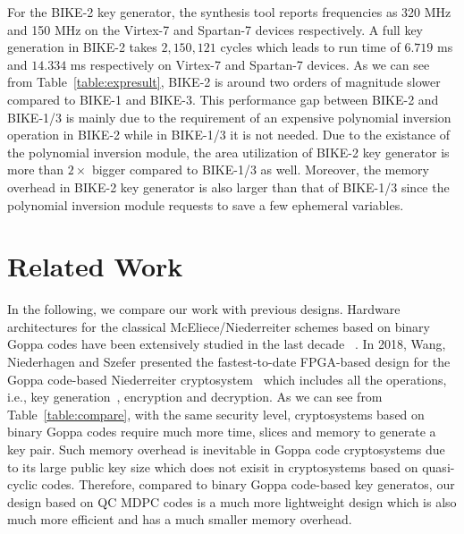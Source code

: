 \documentclass[runningheads]{llncs}
\begin{document}
For the BIKE-2 key generator, the synthesis tool reports
frequencies as 320 MHz and 150 MHz on the Virtex-7 and Spartan-7 devices respectively.
A full key generation in BIKE-2 takes $2,150,121$ cycles 
which leads to run time of $6.719$ ms and $14.334$ ms respectively
on Virtex-7 and Spartan-7 devices. 
As we can see from Table~\ref{table:expresult}, 
BIKE-2 is around two orders of magnitude slower compared to BIKE-1 and BIKE-3.  
This performance gap between BIKE-2 and BIKE-1/3 is mainly
due to the requirement of an expensive polynomial inversion operation in BIKE-2
while in BIKE-1/3 it is not needed. 
Due to the existance of the polynomial inversion module, 
the area utilization of BIKE-2 key generator is more than $2\times$ 
bigger compared to BIKE-1/3 as well. 
Moreover, the memory overhead in BIKE-2 key generator
is also larger than that of BIKE-1/3 since 
the polynomial inversion module 
requests to save a few ephemeral variables.

\section{Related Work}
In the following, we compare our work with previous designs.
Hardware architectures for the classical McEliece/Niederreiter
schemes based on binary Goppa
codes have been extensively studied in the last decade
~\cite{eisenbarth2009microeliece,shoufan2010novel,ghosh2012speed,heyse2012towards,wang2017fpga,wang2018fpga}.
In 2018, Wang, Niederhagen and Szefer presented
the fastest-to-date FPGA-based design for the 
Goppa code-based Niederreiter cryptosystem~\cite{wang2018fpga}
which includes all the operations, i.e.,
key generation~\cite{wang2017fpga}, encryption and decryption.
As we can see from Table~\ref{table:compare}, with the same security level, 
cryptosystems based on binary Goppa codes 
require much more time, slices and memory to generate 
a key pair. 
Such memory overhead is inevitable in Goppa code 
cryptosystems due to its large public key size
which does not exisit in cryptosystems based on
quasi-cyclic codes.
Therefore, compared to binary Goppa code-based key generatos,
our design based on QC MDPC codes is a much more lightweight 
design which is also much more efficient and has a 
much smaller memory overhead.
\end{document}
